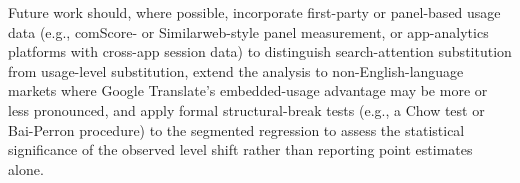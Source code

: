 \documentclass[11pt]{article}
\begin{document}
Future work should, where possible, incorporate first-party or panel-based usage data (e.g., comScore- or Similarweb-style panel measurement, or app-analytics platforms with cross-app session data) to distinguish search-attention substitution from usage-level substitution, extend the analysis to non-English-language markets where Google Translate's embedded-usage advantage may be more or less pronounced, and apply formal structural-break tests (e.g., a Chow test or Bai-Perron procedure) to the segmented regression to assess the statistical significance of the observed level shift rather than reporting point estimates alone.
\end{document}
